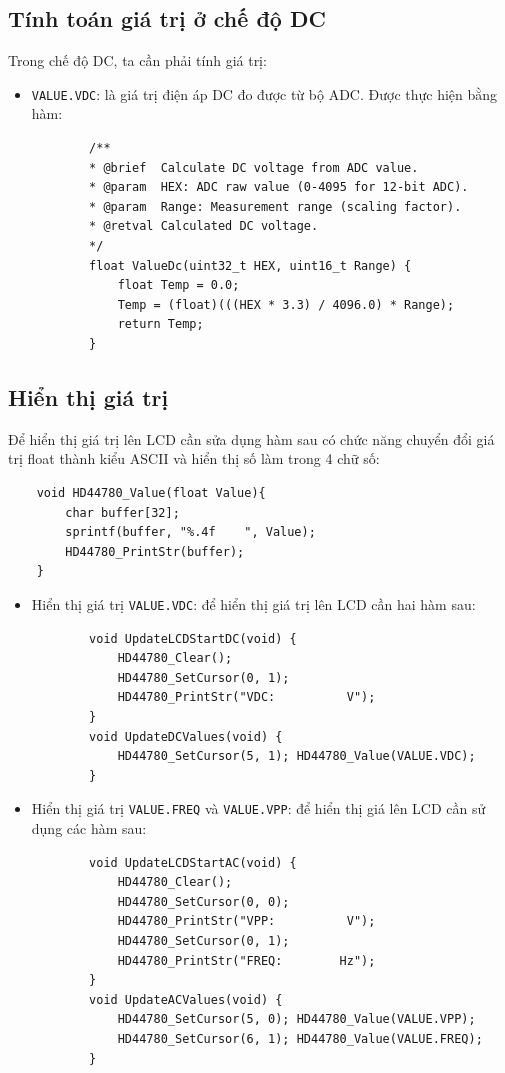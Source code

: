 \subsection{Tính toán giá trị ở chế độ DC}

Trong chế độ DC, ta cần phải tính giá trị:
\begin{itemize}[label = -]
	\item \texttt{VALUE.VDC}: là giá trị điện áp DC đo được từ bộ ADC. Được thực hiện bằng hàm:
	\begin{lstlisting}
		/**
		* @brief  Calculate DC voltage from ADC value.
		* @param  HEX: ADC raw value (0-4095 for 12-bit ADC).
		* @param  Range: Measurement range (scaling factor).
		* @retval Calculated DC voltage.
		*/
		float ValueDc(uint32_t HEX, uint16_t Range) {
			float Temp = 0.0;
			Temp = (float)(((HEX * 3.3) / 4096.0) * Range);
			return Temp;
		}
	\end{lstlisting}
\end{itemize}
\newpage
\subsection{Hiển thị giá trị}

Để hiển thị giá trị lên LCD cần sửa dụng hàm sau có chức năng chuyển đổi giá trị float thành kiểu ASCII và hiển thị số làm trong 4 chữ số:
\begin{lstlisting}
	void HD44780_Value(float Value){
		char buffer[32];
		sprintf(buffer, "%.4f    ", Value);
		HD44780_PrintStr(buffer);
	}
\end{lstlisting}

\begin{itemize}[label=-]
	\item Hiển thị giá trị \texttt{VALUE.VDC}: để hiển thị giá trị lên LCD cần hai hàm sau:
	\begin{lstlisting}
		void UpdateLCDStartDC(void) {
			HD44780_Clear();
			HD44780_SetCursor(0, 1);
			HD44780_PrintStr("VDC:          V");
		}
		void UpdateDCValues(void) {
			HD44780_SetCursor(5, 1); HD44780_Value(VALUE.VDC);
		}
	\end{lstlisting}
	\item Hiển thị giá trị \texttt{VALUE.FREQ} và \texttt{VALUE.VPP}: để hiển thị giá lên LCD cần sử dụng các hàm sau:
	\begin{lstlisting}
		void UpdateLCDStartAC(void) {
			HD44780_Clear();
			HD44780_SetCursor(0, 0);
			HD44780_PrintStr("VPP:          V");
			HD44780_SetCursor(0, 1);
			HD44780_PrintStr("FREQ:        Hz");
		}
		void UpdateACValues(void) {
			HD44780_SetCursor(5, 0); HD44780_Value(VALUE.VPP);
			HD44780_SetCursor(6, 1); HD44780_Value(VALUE.FREQ);
		}
	\end{lstlisting}
\end{itemize}

